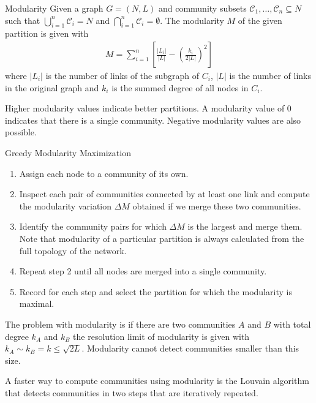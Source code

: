 \documentclass[english]{panikzettel}
\begin{document}
\begin{defi}{Modularity}
Given a graph $ G = (N,L) $ and community subsets $ \mathcal{C}_1, \dots, \mathcal{C}_n \subseteq N $ such that $ \bigcup_{i = 1}^{n} \mathcal{C}_i = N $ and $ \bigcap_{i = 1}^n \mathcal{C}_i = \emptyset $.
The modularity $ M $ of the given partition is given with
\begin{align*}
	M = \sum\limits_{i = 1}^{n} \left[\frac{|L_i|}{|L|} - \left(\frac{k_i}{2|L|}\right)^2\right]
\end{align*}
where $ |L_i| $ is the number of links of the subgraph of $ C_i $, $ |L| $ is the number of links in the original graph and $ k_i $ is the summed degree of all nodes in $ C_i $.
\end{defi}

Higher modularity values indicate better partitions.
A modularity value of 0 indicates that there is a single community.
Negative modularity values are also possible.

\begin{algo}{Greedy Modularity Maximization}
\begin{enumerate}
	\item Assign each node to a community of its own.
	\item Inspect each pair of communities connected by at least one link
	and compute the modularity variation $ \Delta M $ obtained if we merge
	these two communities.
	\item Identify the community pairs for which $ \Delta M $ is the largest and
	merge them. Note that modularity of a particular partition is always
	calculated from the full topology of the network.
	\item Repeat step 2 until all nodes are merged into a single
	community.
	\item Record for each step and select the partition for which the
	modularity is maximal.
\end{enumerate}
\end{algo}

The problem with modularity is if there are two communities $ A $ and $ B $ with total degree $ k_A $ and $ k_B $ the resolution limit of modularity is given with $ k_A \sim k_B = k \leq \sqrt{2L} $.
Modularity cannot detect communities smaller than this size.

A faster way to compute communities using modularity is the Louvain algorithm that detects communities in two steps that are iteratively repeated.
\end{document}
